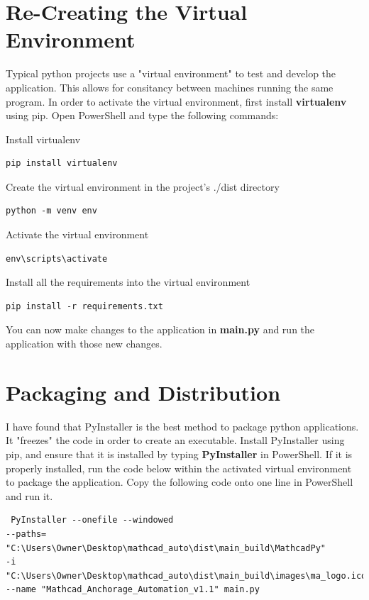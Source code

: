 \documentclass[11pt]{article}
\begin{document}
\section{Re-Creating the Virtual Environment}
\label{sec:orgb4bcacb}
Typical python projects use a "virtual environment" to test and develop the application. This allows for consitancy between machines running the same program. In order to activate the virtual environment, first install \textbf{virtualenv} using pip. Open PowerShell and type the following commands:

Install virtualenv 
\begin{verbatim}
pip install virtualenv
\end{verbatim}

Create the virtual environment in the project's ./dist directory
\begin{verbatim}
python -m venv env
\end{verbatim}

Activate the virtual environment
\begin{verbatim}
env\scripts\activate
\end{verbatim}

Install all the requirements into the virtual environment
\begin{verbatim}
pip install -r requirements.txt
\end{verbatim}

You can now make changes to the application in \textbf{main.py} and run the application with those new changes.

\section{Packaging and Distribution}
\label{sec:org329b412}
I have found that PyInstaller is the best method to package python applications. It "freezes" the code in order to create an executable. Install PyInstaller using pip, and ensure that it is installed by typing \textbf{PyInstaller} in PowerShell. If it is properly installed, run the code below within the activated virtual environment to package the application. Copy the following code onto one line in PowerShell and run it.
\begin{verbatim}
 PyInstaller --onefile --windowed 
--paths= "C:\Users\Owner\Desktop\mathcad_auto\dist\main_build\MathcadPy"
-i  "C:\Users\Owner\Desktop\mathcad_auto\dist\main_build\images\ma_logo.ico" 
--name "Mathcad_Anchorage_Automation_v1.1" main.py
\end{verbatim}
\end{document}
